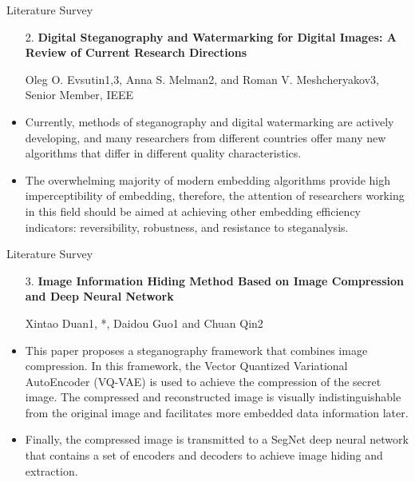 \documentclass[10pt,xcolor=dvipsnames]{beamer}
\begin{document}
\begin{frame}{Literature Survey}
\begin{itemize}
    \item[2.]\textbf{Digital Steganography and Watermarking for Digital Images: A Review of Current Research Directions}
        
        \small Oleg O. Evsutin1,3, Anna S. Melman2, and Roman V. Meshcheryakov3, Senior Member, IEEE
       \item Currently, methods of steganography and digital
        watermarking are actively developing, and many researchers
        from different countries offer many new algorithms that
        differ in different quality characteristics.
        
        \item The overwhelming majority of modern
        embedding algorithms provide high imperceptibility of
        embedding, therefore, the attention of researchers working in
        this field should be aimed at achieving other embedding
        efficiency indicators: reversibility, robustness, and resistance
        to steganalysis.
\end{itemize}
\end{frame}

\begin{frame}{Literature Survey}
\begin{itemize}
    \item[3.]\textbf{Image Information Hiding Method Based on Image Compression and Deep Neural Network}
        
        \small Xintao Duan1, *, Daidou Guo1 and Chuan Qin2
       \item This paper proposes a steganography framework that combines image compression. In this framework, the Vector Quantized Variational AutoEncoder (VQ-VAE) is used to achieve the compression of the secret image. The compressed and reconstructed image is visually indistinguishable from the original image and facilitates more embedded data information later.
       
       \item Finally,
the compressed image is transmitted to a SegNet deep neural network that contains a set of encoders and decoders to achieve image hiding and extraction.
\end{itemize}
\end{frame}
\end{document}
